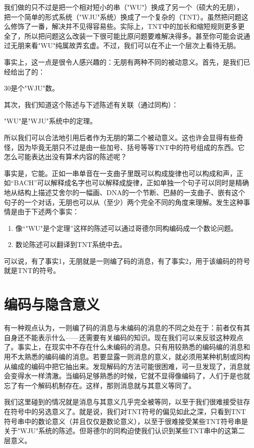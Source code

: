 我们做的只不过是把一个相对短小的串（"WU"）换成了另一个（硕大的无朋），把一个简单的形式系统（"WJU"系统）换成了一个复杂的（TNT）。虽然把问题这么修饰了一番，解决并不见得容易些。实际上，TNT中的加长和缩短规则更多更全了，所以把问题这么改装一下很可能比原问题要难解决得多。甚至你可能会说通过无朋来看"WU"纯属故弄玄虚。不过，我们可以在不止一个层次上看待无朋。

事实上，这一点是很令人感兴趣的：无朋有两种不同的被动意义。首先，是我们已经给出了的：
\begin{center}
$30$是个"WJU"数。
\end{center}
其次，我们知道这个陈述与下述陈述有关联（通过同构）：
\begin{center}
"WU"是"WJU"系统中的定理。
\end{center}
所以我们可以合法地引用后者作为无朋的第二个被动意义。这也许会显得有些奇怪，因为毕竟无朋只不过是由一些加号、括号等等TNT中的符号组成的东西。它怎么可能表达出没有算术内容的陈述呢？

事实是，它能。正如一串单音在一支曲子里既可以构成旋律也可以构成和声，正如“BACH”可以解释成名字也可以解释成旋律，正如单独一个句子可以同时是精确地从结构上描述艾舍尔的一幅画、DNA的一个节断、巴赫的一支曲子、嵌有这个句子的一个对话，无朋也可以从（至少）两个完全不同的角度来理解。发生这种事情是由于下述两个事实：
\begin{enumerate}[labelindent=0pt, label=事实\arabic*, format=\textsf]
\item 像“"WU"是个定理”这样的陈述可以通过哥德尔同构编码成一个数论问题。
\item 数论陈述可以翻译到TNT系统中去。
\end{enumerate}
可以说，有了事实1，无朋就是一则编了码的消息，有了事实2，用于该编码的符号就是TNT的符号。

\section{编码与隐含意义}

有一种观点认为，一则编了码的消息与未编码的消息的不同之处在于：前者仅有其自身还不能表示什么——还需要有关编码的知识。现在我们可以来反驳这种观点了。事实上，在现实中不存在什么未编码的消息。只有用较熟悉的编码编的消息和用不太熟悉的编码编的消息。若要显露一则消息的意义，就必须用某种机制或同构从编成的编码中把它抽出来。发现解码的方法可能很困难，可一旦发现了，消息就会变得水一样清澈。当编码足够熟悉的时候，它就不显得像编码了，人们于是也就忘了有一个解码机制存在。这样，那则消息就与其意义等同了。

我们这里碰到的情况就是消息与其意义几乎完全被等同，以至于我们很难接受驻存在符号中的另选意义了。就是说，我们对TNT符号的偏见如此之深，只看到TNT符号串中的数论意义（并且仅仅是数论意义），以至于很难接受某些TNT符号串是关于"WJU"系统的陈述。但哥德尔的同构迫使我们认识到某些TNT串中的这第二层意义。

